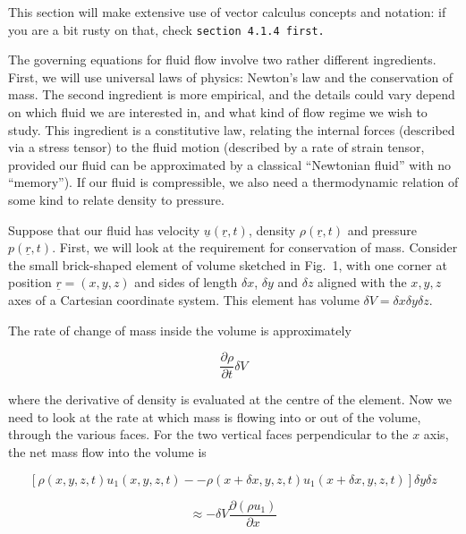   This section will make extensive use of vector calculus concepts and 
  notation: if you are a bit rusty on that, check \tt{}section 4.1.4\rm{} 
  first. 

  The governing equations for fluid flow involve two rather different 
  ingredients. First, we will use universal laws of physics: Newton's law and 
  the conservation of mass. The second ingredient is more empirical, and the 
  details could vary depend on which fluid we are interested in, and what kind 
  of flow regime we wish to study. This ingredient is a constitutive law, 
  relating the internal forces (described via a stress tensor) to the fluid 
  motion (described by a rate of strain tensor, provided our fluid can be 
  approximated by a classical ``Newtonian fluid'' with no ``memory''). If our 
  fluid is compressible, we also need a thermodynamic relation of some kind to 
  relate density to pressure. 

  Suppose that our fluid has velocity $\underline{u}(\underline{r},t)$, density 
  $\rho(\underline{r},t)$ and pressure $p(\underline{r},t)$. First, we will 
  look at the requirement for conservation of mass. Consider the small 
  brick-shaped element of volume sketched in Fig.\ 1, with one corner at 
  position $\underline{r}=(x,y,z)$ and sides of length $\delta x$, $\delta y$ 
  and $\delta z$ aligned with the $x,y,z$ axes of a Cartesian coordinate 
  system. This element has volume $\delta V= \delta x \delta y \delta z$. 


  The rate of change of mass inside the volume is approximately 

  \begin{equation*}\dfrac{\partial \rho}{\partial t} \delta V 
  \tag{1}\end{equation*} 

  \noindent{}where the derivative of density is evaluated at the centre of the 
  element. Now we need to look at the rate at which mass is flowing into or out 
  of the volume, through the various faces. For the two vertical faces 
  perpendicular to the $x$ axis, the net mass flow into the volume is 

  \begin{equation*}\left[\rho(x,y,z,t) u_1(x,y,z,t) -- \rho (x + \delta 
  x,y,z,t) u_1(x + \delta x,y,z,t) \right] \delta y \delta z \end{equation*} 

  \begin{equation*}\approx -\delta V \dfrac{\partial (\rho u_1)}{\partial x} 
  \tag{2}\end{equation*} 

